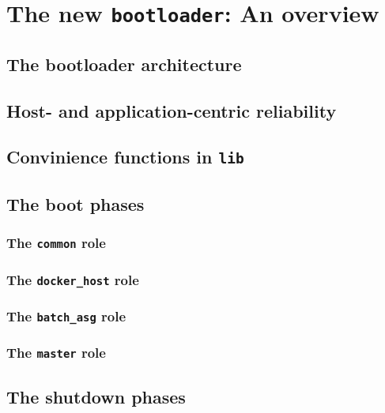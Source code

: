 \chapter{The new \texttt{bootloader}: An overview}\label{p01:ch04}
	\section{The bootloader architecture}
	\section{Host- and application-centric reliability}
	\section{Convinience functions in \texttt{lib}}
	\section{The boot phases}
		\subsection{The \texttt{common} role}
		\subsection{The \texttt{docker\_host} role}
		\subsection{The \texttt{batch\_asg} role}
		\subsection{The \texttt{master} role}
	\section{The shutdown phases}